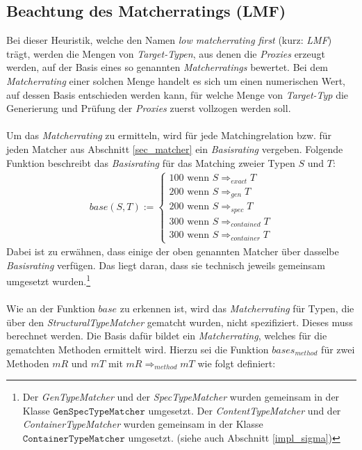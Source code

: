 \subsection{Beachtung des Matcherratings (LMF)}\label{sec_lmf}
Bei dieser \Gls{Heuristik}, welche den Namen \emph{low matcherrating first} (kurz: \emph{LMF}) trägt, werden die Mengen von \emph{Target-Typen}, aus denen die \emph{Proxies} erzeugt werden, auf der Basis eines so genannten \emph{Matcherratings} bewertet. Bei dem \emph{Matcherrating} einer solchen Menge handelt es sich um einen numerischen Wert, auf dessen Basis entschieden werden kann, für welche Menge von \emph{Target-Typ} die Generierung und Prüfung der \emph{Proxies} zuerst vollzogen werden soll.
\\\\
Um das \emph{Matcherrating} zu ermitteln, wird für jede Matchingrelation bzw. für jeden Matcher aus Abschnitt \ref{sec_matcher} ein \emph{Basisrating} vergeben. Folgende Funktion beschreibt das \emph{Basisrating} für das Matching zweier Typen $S$ und $T$:
\begin{gather*}
\mathit{base(S,T)} :=  \left\{ 
				\begin{array}{l}
					100 \text{ wenn } S \Rightarrow_{exact}  T  \\
					200 \text{ wenn } S \Rightarrow_{gen}  T  \\
					200 \text{ wenn } S \Rightarrow_{spec}  T  \\
					300 \text{ wenn } S \Rightarrow_{contained}  T   \\
					300 \text{ wenn } S \Rightarrow_{container}  T  				
				\end{array}             
	\right.
\end{gather*}
\noindent
Dabei ist zu erwähnen, dass einige der oben genannten Matcher über dasselbe \emph{Basisrating} verfügen. Das liegt daran, dass sie technisch jeweils gemeinsam umgesetzt wurden.\footnote{Der \emph{GenTypeMatcher} und der \emph{SpecTypeMatcher} wurden gemeinsam in der Klasse $\texttt{GenSpecTypeMatcher}$ umgesetzt. Der \emph{ContentTypeMatcher} und der \emph{ContainerTypeMatcher} wurden gemeinsam in der Klasse $\texttt{ContainerTypeMatcher}$ umgesetzt. (siehe auch Abschnitt \ref{impl_sigma})}
\\\\
Wie an der Funktion $\mathit{base}$ zu erkennen ist, wird das \emph{Matcherrating} für Typen, die über den \emph{StructuralTypeMatcher} gematcht wurden, nicht spezifiziert. Dieses muss berechnet werden. Die Basis dafür bildet ein \emph{Matcherrating}, welches für die gematchten Methoden ermittelt wird. Hierzu sei die Funktion $\mathit{bases_{method}}$ für zwei Methoden $\mathit{mR}$ und $\mathit{mT}$ mit $\mathit{mR} \Rightarrow_{method} \mathit{mT}$ wie folgt definiert:
